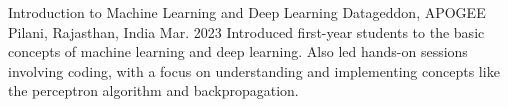 

\begin{cventries}

  \cventry
    {Introduction to Machine Learning and Deep Learning} %
    {Datageddon, APOGEE} %
    {Pilani, Rajasthan, India} %
    {Mar. 2023} %
    {
        Introduced first-year students to the basic concepts of machine learning and deep
        learning. Also led hands-on sessions involving coding, with a focus on understanding
        and implementing concepts like the perceptron algorithm and backpropagation.
    }

\end{cventries}
